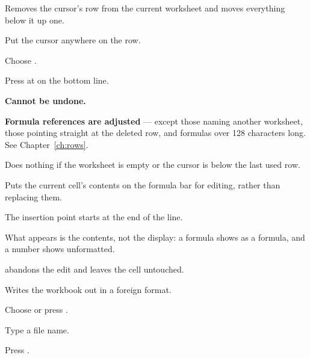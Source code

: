 
Removes the cursor's row from the current worksheet and moves everything below
it up one.

\begin{ccprocedure}[]
\item Put the cursor anywhere on the row.
\item Choose .
\item Press  at  on the bottom line.
\end{ccprocedure}

\begin{ccsteps}
\item \textbf{Cannot be undone.}
\item \textbf{Formula references are adjusted} --- except those naming another
worksheet, those pointing straight at the deleted row, and formulas over 128
characters long. See Chapter~\ref{ch:rows}.
\item Does nothing if the worksheet is empty or the cursor is below the last
used row.
\end{ccsteps}


Puts the current cell's contents on the formula bar for editing, rather than
replacing them.

\begin{ccsteps}
\item The insertion point starts at the end of the line.
\item What appears is the contents, not the display: a formula shows as a
formula, and a number shows unformatted.
\item {} abandons the edit and leaves the cell untouched.
\end{ccsteps}


Writes the workbook out in a foreign format.

\begin{ccprocedure}[]
\item Choose  or press .
\item Type a file name.
\item Press .
\end{ccprocedure}

